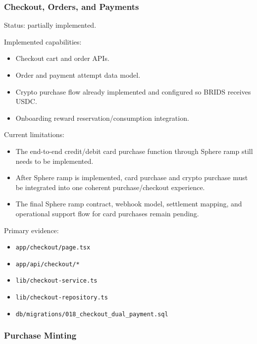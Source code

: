 \documentclass[
  10pt,
  letterpaper,
]{article}
\providecommand{\tightlist}{%
  \setlength{\itemsep}{0pt}\setlength{\parskip}{0pt}}
\let\oldtexttt\texttt
\renewcommand{\texttt}[1]{\oldtexttt{\small #1}}
\begin{document}
\subsubsection{Checkout, Orders, and
Payments}\label{checkout-orders-and-payments}

Status: partially implemented.

Implemented capabilities:

\begin{itemize}
\tightlist
\item
  Checkout cart and order APIs.
\item
  Order and payment attempt data model.
\item
  Crypto purchase flow already implemented and configured so BRIDS
  receives USDC.
\item
  Onboarding reward reservation/consumption integration.
\end{itemize}

Current limitations:

\begin{itemize}
\tightlist
\item
  The end-to-end credit/debit card purchase function through Sphere ramp
  still needs to be implemented.
\item
  After Sphere ramp is implemented, card purchase and crypto purchase
  must be integrated into one coherent purchase/checkout experience.
\item
  The final Sphere ramp contract, webhook model, settlement mapping, and
  operational support flow for card purchases remain pending.
\end{itemize}

Primary evidence:

\begin{itemize}
\tightlist
\item
  \texttt{app/checkout/page.tsx}
\item
  \texttt{app/api/checkout/*}
\item
  \texttt{lib/checkout-service.ts}
\item
  \texttt{lib/checkout-repository.ts}
\item
  \texttt{db/migrations/018\_checkout\_dual\_payment.sql}
\end{itemize}

\subsubsection{Purchase Minting}\label{purchase-minting-1}
\end{document}
